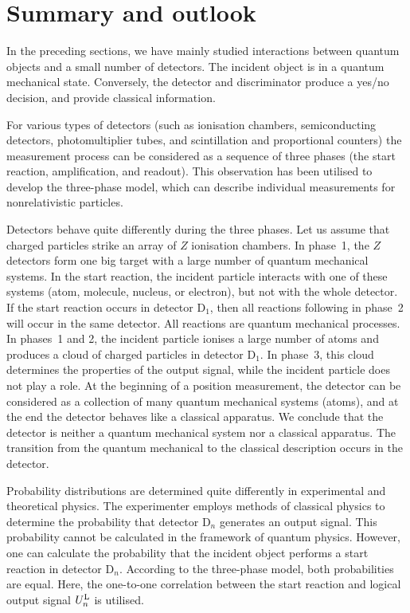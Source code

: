 \documentclass[11pt,a4paper]{article}
\begin{document}

\section{Summary and outlook}   

In the preceding sections, we have mainly studied interactions between quantum objects and a small number of detectors.  
The incident object is in a quantum mechanical state.  
Conversely, the detector and discriminator produce a yes/no decision, and provide classical information.  

For various types of detectors (such as ionisation chambers, semiconducting detectors, photomultiplier tubes, and scintillation and proportional counters) the measurement process can be considered as a sequence of three phases (the start reaction, amplification, and readout).  
This observation has been utilised to develop the three-phase model, which can describe individual measurements for nonrelativistic particles.  

Detectors behave quite differently during the three phases.  Let us assume that charged particles strike an array of $Z$ ionisation chambers.  
In phase~1, the $Z$ detectors form one big target with a large number of quantum mechanical systems.  
In the start reaction, the incident particle interacts with one of these systems (atom, molecule, nucleus, or electron), but not with the whole detector.  
If the start reaction occurs in detector D$_1$, then all reactions following in phase~2 will occur in the same detector.  
All reactions are quantum mechanical processes.  
In phases~1 and 2, the incident particle ionises a large number of atoms and produces a cloud of charged particles in detector D$_1$.  In phase~3, this cloud determines the properties of the output signal, while the incident particle does not play a role.  
At the beginning of a position measurement, the detector can be considered as a collection of many quantum mechanical systems (atoms), and at the end the detector behaves like a classical apparatus.  
We conclude that the detector is neither a quantum mechanical system nor a classical apparatus.  The transition from the quantum mechanical to the classical description occurs in the detector.  

Probability distributions are determined quite differently in experimental and theoretical physics.  The experimenter employs methods of classical physics to determine the probability that detector D$_n$ generates an output signal.  
This probability cannot be calculated in the framework of quantum physics.  
However, one can calculate the probability that the incident object performs a start reaction in detector D$_n$.  
According to the three-phase model, both probabilities are equal.  
Here, the one-to-one correlation between the start reaction and logical output signal $U_n^{\rm L}$ is utilised.  
\end{document}
